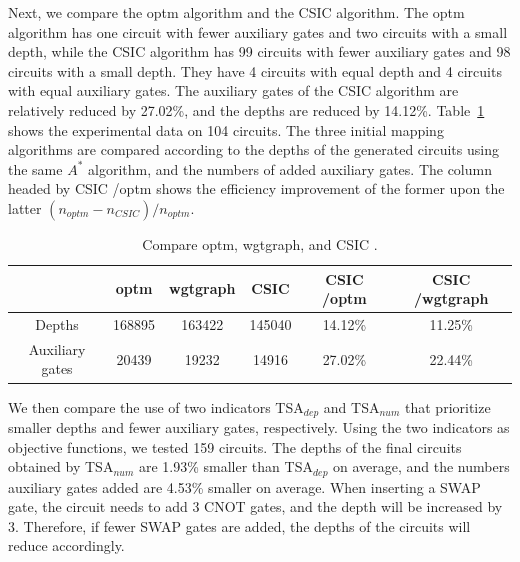 \documentclass[runningheads]{llncs}
\begin{document}
Next, we compare the optm algorithm and the CSIC algorithm. The optm algorithm has one circuit with fewer auxiliary gates and two circuits with a small depth, while the CSIC algorithm has 99 circuits with fewer auxiliary gates and 98 circuits with a small depth.  
They have 4 circuits with equal depth and 4 circuits with equal auxiliary gates. The auxiliary gates of the CSIC algorithm are relatively reduced by 27.02\%, and the depths are reduced by 14.12\%. Table~\ref{tab1} shows the experimental data on 104 circuits. The three initial mapping algorithms are compared according to the depths of the generated circuits using the same $A^{*}$ algorithm, and the numbers of added auxiliary gates. The column headed by CSIC /optm  shows the efficiency improvement of the former upon the latter $(n_{optm}-n_{CSIC })/n_{optm}$.
\begin{table}
	\begin{center}  
	\begin{tabular}{|c|c|c|c|c|c|}
	\hline
	    	&  optm & wgtgraph &CSIC & CSIC /optm & CSIC /wgtgraph\\
	\hline
	 Depths 	&	168895	&   163422	&  145040 	& 14.12\%  &11.25\%   \\
	\hline
	 Auxiliary gates 	&	20439	&  19232 	&  14916 & 27.02\% 	&  22.44\%  \\
	\hline
	\end{tabular} 
	\end{center} 
	\caption{Compare optm, wgtgraph, and CSIC .}
	\label{tab1}
	\end{table}

	We then compare the use of two indicators TSA$_{dep}$ and TSA$_{num}$ that prioritize smaller depths and fewer auxiliary gates, respectively. Using the two indicators  as objective functions, we tested 159 circuits. The depths of the final circuits obtained by TSA$_{num}$ are 1.93\% smaller than TSA$_{dep}$ on average, and the numbers auxiliary gates added are 4.53\% smaller on average. When inserting a SWAP gate, the circuit needs to add 3 CNOT gates, and the depth will be increased by 3.  Therefore, if fewer SWAP gates are added, the depths of the circuits will reduce accordingly. 
\end{document}
